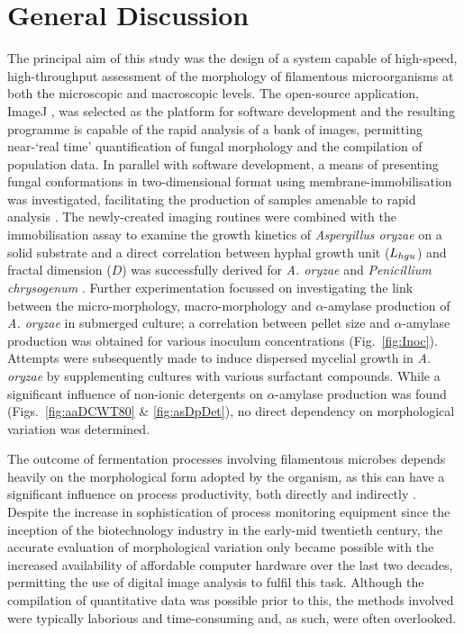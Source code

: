\chapter{General Discussion}

The principal aim of this study was the design of a system capable of high-speed, high-throughput assessment of the morphology of filamentous microorganisms at both the microscopic and macroscopic levels. The open-source application, ImageJ \cite{imagej}, was selected as the platform for software development and the resulting programme is capable of the rapid analysis of a bank of images, permitting near-\lq real time' quantification of fungal morphology and the compilation of population data. In parallel with software development, a means of presenting fungal conformations in two-dimensional format using membrane-immobilisation was investigated, facilitating the production of samples amenable to rapid analysis \cite{barry2007}. The newly-created imaging routines were combined with the immobilisation assay to examine the growth kinetics of \emph{Aspergillus oryzae} on a solid substrate \cite{barry2009} and a direct correlation between hyphal growth unit ($L_{hgu}$) and fractal dimension ($D$) was successfully derived for \emph{A. oryzae} and \emph{Penicillium chrysogenum} \cite{barry2009a}. Further experimentation focussed on investigating the link between the micro-morphology, macro-morphology and $\alpha$-amylase production of \emph{A. oryzae} in submerged culture; a correlation between pellet size and $\alpha$-amylase production was obtained for various inoculum concentrations (Fig.~\ref{fig:Inoc}). Attempts were subsequently made to induce dispersed mycelial growth in \emph{A. oryzae} by supplementing cultures with various surfactant compounds. While a significant influence of non-ionic detergents on $\alpha$-amylase production was found (Figs.~\ref{fig:aaDCWT80} \& \ref{fig:asDpDet}), no direct dependency on morphological variation was determined.

The outcome of fermentation processes involving filamentous microbes depends heavily on the morphological form adopted by the organism, as this can have a significant influence on process productivity, both directly and indirectly \cite{papagiannireview,znidarsic2001}. Despite the increase in sophistication of process monitoring equipment since the inception of the biotechnology industry in the early-mid twentieth century, the accurate evaluation of morphological variation only became possible with the increased availability of affordable computer hardware over the last two decades, permitting the use of digital image analysis to fulfil this task. Although the compilation of quantitative data was possible prior to this, the methods involved were typically laborious and time-consuming \cite{trinci1974,metz1981} and, as such, were often overlooked.

